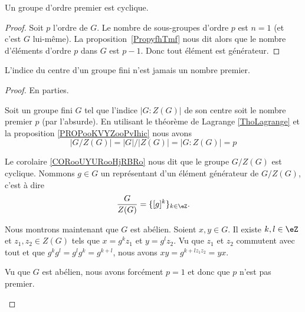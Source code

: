 \begin{corollary}		\label{CORooUYURooHjRBRo}
	Un groupe d'ordre premier est cyclique.
\end{corollary}

\begin{proof}
	Soit \( p\) l'ordre de \( G\). Le nombre de sous-groupes d'ordre \( p\) est \( n=1\) (et c'est \( G\) lui-même). La proposition~\ref{PropyfhTmf} nous dit alors que le nombre d'éléments d'ordre \( p\) dans \( G\) est \( p-1\). Donc tout élément est générateur.
\end{proof}



\begin{proposition}       \label{PROPooWPQTooECUPLK}
	L'indice du centre d'un groupe fini n'est jamais un nombre premier.
\end{proposition}

\begin{proof}
	En parties.
	\begin{subproof}
		Soit un groupe fini \( G\) tel que l'indice \( | G:Z(G) |\) de son centre soit le nombre premier \( p\) (par l'absurde). En utilisant le théorème de Lagrange \ref{ThoLagrange} et la proposition \ref{PROPooKVYZooPvIhic} nous avons
		\begin{equation}
			| G/Z(G) |=| G |/| Z(G) |=| G:Z(G) |=p
		\end{equation}

		Le corolaire \ref{CORooUYURooHjRBRo} nous dit que le groupe \( G/Z(G)\) est cyclique. Nommons \( g\in G\) un représentant d'un élément générateur de \( G/Z(G)\), c'est à dire
		\begin{equation}
			\frac{ G }{ Z(G) }=\{ [g]^k \}_{k\in \eZ}.
		\end{equation}

		Nous montrons maintenant que \( G\) est abélien. Soient \( x,y\in G\). Il existe \( k,l\in \eZ\) et \( z_1,z_2\in Z(G)\) tels que \( x=g^kz_1\) et \( y=g^lz_2\). Vu que \( z_1\) et \( z_2\) commutent avec tout et que \( g^kg^l=g^lg^k=g^{k+l}\), nous avons \( xy=g^{k+lz_1z_2}=yx\).

		\spitem[Conclusion]
		Vu que \( G\) est abélien, nous avons forcément \( p=1\) et donc que \( p\) n'est pas premier.
	\end{subproof}
\end{proof}

